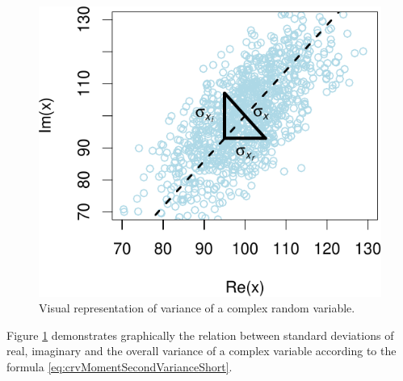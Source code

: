 \documentclass[
]{book}
\begin{document}
\begin{figure}
\centering
\includegraphics{Svetunkov---Svetunkov---Complex-Dynamic-Models_files/figure-latex/crvMomentSecondVariance-1.pdf}
\caption{\label{fig:crvMomentSecondVariance}Visual representation of variance of a complex random variable.}
\end{figure}

Figure \ref{fig:crvMomentSecondVariance} demonstrates graphically the relation between standard deviations of real, imaginary and the overall variance of a complex variable according to the formula \eqref{eq:crvMomentSecondVarianceShort}.
\end{document}
